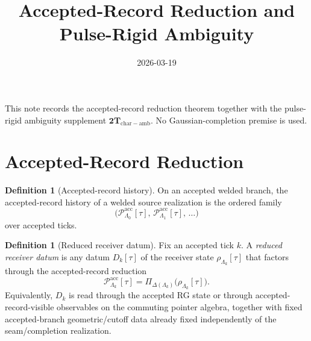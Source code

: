 \documentclass[11pt]{article}
\title{Accepted-Record Reduction and Pulse-Rigid Ambiguity}
\date{2026-03-19}
\theoremstyle{definition}
\newtheorem{definition}[theorem]{Definition}
\begin{document}
\maketitle

This note records the accepted-record reduction theorem together with the pulse-rigid ambiguity
supplement
\(
\mathbf{2T}_{\mathrm{char\!-\!amb}}
\).
No Gaussian-completion premise is used.

\section{Accepted-Record Reduction}

\begin{definition}[Accepted-record history]
\label{def:accepted-record-history}
On an accepted welded branch, the accepted-record history of a welded source realization is the ordered
family
\[
\Big(
\mathcal P^{\mathrm{acc}}_{\Lambda_0}[\tau],\,
\mathcal P^{\mathrm{acc}}_{\Lambda_1}[\tau],\,
\ldots
\Big)
\]
over accepted ticks.
\end{definition}

\begin{definition}[Reduced receiver datum]
\label{def:reduced-datum}
Fix an accepted tick \(k\).
A \emph{reduced receiver datum} is any datum \(D_k[\tau]\) of the receiver state
\(\rho_{\Lambda_k}[\tau]\) that factors through the accepted-record reduction
\[
\mathcal P^{\mathrm{acc}}_{\Lambda_k}[\tau]
=
\Pi_{\Delta(\Lambda_k)}\!\big(\rho_{\Lambda_k}[\tau]\big).
\]
Equivalently, \(D_k\) is read through the accepted RG state or through accepted-record-visible
observables on the commuting pointer algebra, together with fixed accepted-branch geometric/cutoff
data already fixed independently of the seam/completion realization.
\end{definition}
\end{document}
